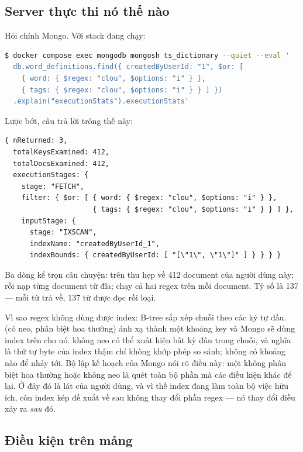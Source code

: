 \subsection{Server thực thi nó thế nào}

Hỏi chính Mongo. Với stack đang chạy:

\begin{handson}
\begin{lstlisting}[language=bash]
$ docker compose exec mongodb mongosh ts_dictionary --quiet --eval '
  db.word_definitions.find({ createdByUserId: "1", $or: [
    { word: { $regex: "clou", $options: "i" } },
    { tags: { $regex: "clou", $options: "i" } } ] })
  .explain("executionStats").executionStats'
\end{lstlisting}
Lược bớt, câu trả lời trông thế này:
\begin{lstlisting}
{ nReturned: 3,
  totalKeysExamined: 412,
  totalDocsExamined: 412,
  executionStages: {
    stage: "FETCH",
    filter: { $or: [ { word: { $regex: "clou", $options: "i" } },
                     { tags: { $regex: "clou", $options: "i" } } ] },
    inputStage: {
      stage: "IXSCAN",
      indexName: "createdByUserId_1",
      indexBounds: { createdByUserId: [ "[\"1\", \"1\"]" ] } } } }
\end{lstlisting}
Ba dòng kể trọn câu chuyện:  trên 
thu hẹp về 412 document của người dùng này;  rồi nạp từng
document từ đĩa;  chạy cả hai regex trên mỗi document. Tỷ
số  là 137 --- mỗi từ trả về, 137
từ được đọc rồi loại.
\end{handson}

Vì sao regex không dùng được index: B-tree sắp xếp chuỗi theo các ký
tự đầu.  (có neo, phân biệt hoa thường) ánh xạ thành một
khoảng key và Mongo sẽ dùng index trên  cho nó. 
không neo có thể xuất hiện bất kỳ đâu trong chuỗi, và  nghĩa là
thứ tự byte của index thậm chí không khớp phép so sánh; không có khoảng
nào để nhảy tới. Bộ lập kế hoạch của Mongo nói rõ điều này: một
 không phân biệt hoa thường hoặc không neo là quét toàn
bộ phần mà các điều kiện khác để lại. Ở đây đó là lát của người dùng,
và vì thế index  đang làm toàn bộ việc hữu ích,
còn index kép đề xuất về sau không thay đổi phần regex --- nó thay đổi
điều xảy ra \emph{sau} đó.

\subsection{Điều kiện trên mảng}

